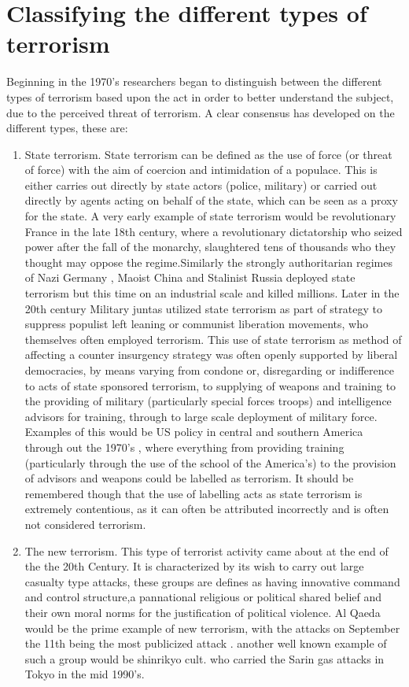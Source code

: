 \section{Classifying the different types of terrorism}
Beginning in the 1970's researchers began to distinguish between the different types of terrorism based upon the act in order to better understand the subject, due to the perceived threat of terrorism. A clear consensus has developed on the different types, these are:
\begin{enumerate}
\item State terrorism. State terrorism can be defined as the use of force (or threat of force) with the aim of coercion and intimidation of a populace. This is either carries out directly by state actors (police, military) or carried out directly by agents acting on behalf of the state, which can be seen as a proxy for the state. A very early example of state terrorism would be revolutionary France in the late 18th century, where a revolutionary dictatorship who seized power after the fall of the monarchy, slaughtered tens of thousands who they thought may oppose the regime.Similarly the strongly authoritarian regimes of Nazi Germany \citep{gibbs1989conceptualization}, Maoist China and Stalinist Russia \citep{blakeley2009state} deployed state terrorism but this time on an industrial scale and killed millions. Later in the 20th century Military juntas utilized  state terrorism  as part of strategy to suppress populist left leaning or communist liberation movements, who themselves often employed terrorism. This use of state terrorism as method of affecting a counter insurgency strategy was often openly supported by liberal democracies, by means varying from condone or, disregarding or indifference to acts of state sponsored terrorism, to supplying of weapons and training to the providing of military (particularly special forces troops) and intelligence advisors  for training, through to large scale deployment of military force. Examples of this would be US policy in central and southern America through out the 1970's \citep{gareau2004state}, where everything from providing training (particularly through the use of the school of the America's) to the provision of advisors and weapons \citep{koonings1999societies} could be labelled as terrorism. It should be remembered though that the use of labelling acts as state terrorism is extremely contentious, as it can often be attributed incorrectly and is often not considered terrorism.
\item The new terrorism. This type of terrorist activity came about at the end of the the 20th  Century. It is characterized by its wish to carry out large casualty type attacks, these groups are defines as having innovative command and control structure,a pannational religious or political shared belief and their own moral norms for the justification of political violence. Al Qaeda would be the prime example of new terrorism, with the attacks on September the 11th being the most publicized attack \citep{burke2004qaeda}. another well known example of such a group would be shinrikyo cult. \citep{morgan2004origins} who carried the Sarin gas attacks in Tokyo in the mid 1990's.

\end{enumerate}
